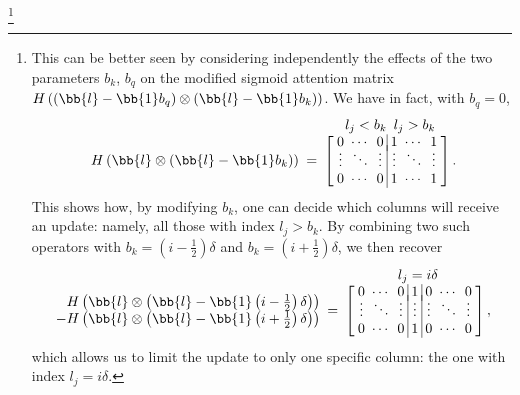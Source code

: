\footnote{\label{fnt::sigmoid_attention_mat}
This can be better seen by considering independently the effects of the two parameters $b_k$, $b_q$ on the modified sigmoid attention matrix $H\left(\left(\bb{l}-\bb{1}b_q\right)\otimes\left(\bb{l}-\bb{1}b_k\right)\right)$. We have in fact, with $b_q=0$,
\begin{equation}
    \arraycolsep=2.5pt
    \begin{array}{cc}    
    &\begin{array}{rl}
        l_j<b_k & l_j>b_k
    \end{array}\\
    \begin{array}{r}
    H\left(\bb{l}\otimes\left(\bb{l}-\bb{1}b_k\right)\right)
    \end{array}=& \left[\begin{array}{ccc|ccc}
    0      & \cdots & 0      & 1      & \cdots & 1     \\[-1ex]
    \vdots & \ddots & \vdots & \vdots & \ddots & \vdots\\
    0      & \cdots & 0      & 1      & \cdots & 1     \\
    \end{array}\right].\\
    \end{array}
\end{equation}
This shows how, by modifying $b_k$, one can decide which columns will receive an update: namely, all those with index $l_j>b_k$. By combining two such operators with $b_k=\left(i-\frac{1}{2}\right)\delta$ and $b_k=\left(i+\frac{1}{2}\right)\delta$, we then recover
\begin{equation}
    \arraycolsep=2.5pt
    \begin{array}{cc}
    &l_j=i\delta\\%
    \begin{array}{r}
    H\left(\bb{l}\otimes\left(\bb{l}-\bb{1}\left(i-\frac{1}{2}\right)\delta\right)\right)\\
    -H\left(\bb{l}\otimes\left(\bb{l}-\bb{1}\left(i+\frac{1}{2}\right)\delta\right)\right) 
    \end{array}=&
    \left[\begin{array}{ccc|c|ccc}
    0      & \cdots & 0      & 1      & 0      & \cdots & 0     \\[-1ex]
    \vdots & \ddots & \vdots & \vdots & \vdots & \ddots & \vdots\\
    0      & \cdots & 0      & 1      & 0      & \cdots & 0     \\
    \end{array}\right],
    \end{array}
    \label{eqn::multihead_bq0}
\end{equation}
which allows us to limit the update to only one specific column: the one with index $l_j=i\delta$.

}
